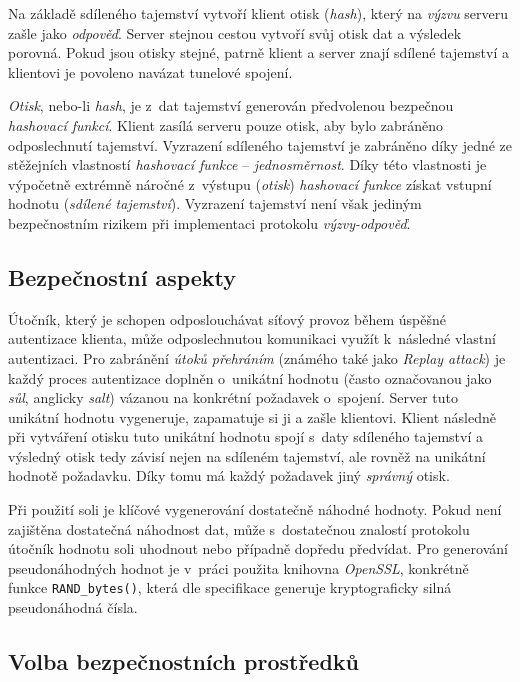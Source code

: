 \documentclass[thesis=M,czech]{FITthesis}[2012/10/20]
\begin{document}
Na základě sdíleného tajemství vytvoří klient otisk (\textit{hash}), který na \textit{výzvu} serveru zašle jako \textit{odpověď}. Server stejnou cestou vytvoří svůj otisk dat a výsledek porovná. Pokud jsou otisky stejné, patrně klient a server znají sdílené tajemství a klientovi je povoleno navázat tunelové spojení.

\textit{Otisk}, nebo-li \textit{hash}, je z~dat tajemství generován předvolenou bezpečnou \textit{hashovací funkcí}. Klient zasílá serveru pouze otisk, aby bylo zabráněno odposlechnutí tajemství. Vyzrazení sdíleného tajemství je zabráněno díky jedné ze stěžejních vlastností \textit{hashovací funkce} -- \textit{jednosměrnost}. Díky této vlastnosti je výpočetně extrémně náročné z~výstupu (\textit{otisk}) \textit{hashovací funkce} získat vstupní hodnotu (\textit{sdílené tajemství}). Vyzrazení tajemství není však jediným bezpečnostním rizikem při implementaci protokolu \textit{výzvy-odpověď}.

\subsection{Bezpečnostní aspekty}

Útočník, který je schopen odposlouchávat síťový provoz během úspěšné autentizace klienta, může odposlechnutou komunikaci využít k~následné vlastní autentizaci. Pro zabránění \textit{útoků přehráním} (známého také jako \textit{Replay attack}) je každý proces autentizace doplněn o~unikátní hodnotu (často označovanou jako \textit{sůl}, anglicky \textit{salt}) vázanou na konkrétní požadavek o~spojení. Server tuto unikátní hodnotu vygeneruje, zapamatuje si ji a zašle klientovi. Klient následně při vytváření otisku tuto unikátní hodnotu spojí s~daty sdíleného tajemství a výsledný otisk tedy závisí nejen na sdíleném tajemství, ale rovněž na unikátní hodnotě požadavku. Díky tomu má každý požadavek jiný \textit{správný} otisk.

Při použití soli je klíčové vygenerování dostatečně náhodné hodnoty. Pokud není zajištěna dostatečná náhodnost dat, může s~dostatečnou znalostí protokolu útočník hodnotu soli uhodnout nebo případně dopředu předvídat. Pro generování pseudonáhodných hodnot je v~práci použita knihovna \textit{OpenSSL}, konkrétně funkce \texttt{RAND\_bytes()}, která dle specifikace\cite{openssl-randbytes} generuje kryptograficky silná pseudonáhodná čísla.

\subsection{Volba bezpečnostních prostředků}
\end{document}
